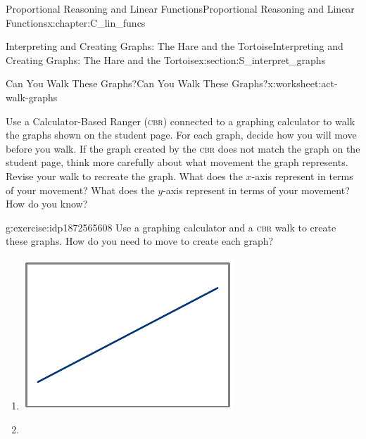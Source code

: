 \documentclass[oneside,10pt,]{book}
\newcommand{\initialism}[1]{\textsc{\MakeLowercase{#1}}}
\numberwithin{equation}{chapter}
\begin{document}
\begin{chapterptx}{Proportional Reasoning and Linear Functions}{}{Proportional Reasoning and Linear Functions}{}{}{x:chapter:C_lin_funcs}
\begin{sectionptx}{Interpreting and Creating Graphs: The Hare and the Tortoise}{}{Interpreting and Creating Graphs: The Hare and the Tortoise}{}{}{x:section:S_interpret_graphs}
\begin{worksheet-subsection}{Can You Walk These Graphs?}{}{Can You Walk These Graphs?}{}{}{x:worksheet:act-walk-graphs}
\begin{introduction}{}%
Use a Calculator-Based Ranger (\initialism{CBR}) connected to a graphing calculator to walk the graphs shown on the student page. For each graph, decide how you will move before you walk. If the graph created by the \initialism{CBR} does not match the graph on the student page, think more carefully about what movement the graph represents. Revise your walk to recreate the graph. What does the \(x\)-axis represent in terms of your movement? What does the \(y\)-axis represent in terms of your movement? How do you know?%
\end{introduction}%
\begin{divisionexercise}{1}{}{}{g:exercise:idp1872565608}%
Use a graphing calculator and a \initialism{CBR} walk to create these graphs. How do you need to move to create each graph?%
\begin{enumerate}[font=\bfseries,label=(\alph*),ref=\alph*]
\item{}\begin{image}{0.325}{0.35}{0.325}%
\includegraphics[width=\linewidth]{external/walk-graphs-1.pdf}
\end{image}%
%
\item{}\begin{image}{0.325}{0.35}{0.325}%

\end{image}
\end{enumerate}
\end{divisionexercise}
\end{worksheet-subsection}
\end{sectionptx}
\end{chapterptx}
\end{document}
